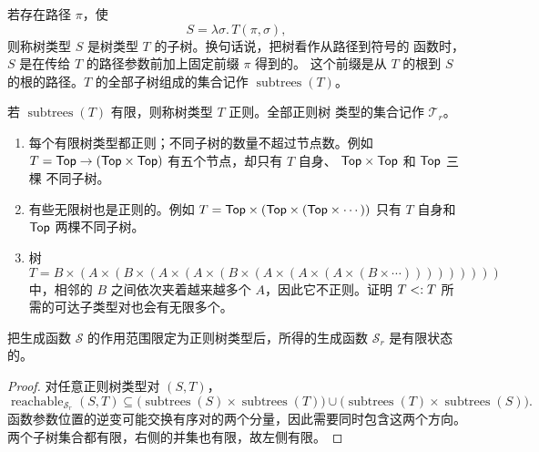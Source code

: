 \begin{definition}
\label{def:21.7.1}
若存在路径 \(\pi\)，使
\[
S=\lambda\sigma.\,T(\pi,\sigma),
\]
则称树类型 \(S\) 是树类型 \(T\) 的子树。换句话说，把树看作从路径到符号的
函数时，\(S\) 是在传给 \(T\) 的路径参数前加上固定前缀 \(\pi\) 得到的。
这个前缀是从 \(T\) 的根到 \(S\) 的根的路径。\(T\) 的全部子树组成的集合记作
\(\operatorname{subtrees}(T)\)。
\end{definition}

\begin{definition}
\label{def:21.7.2}
若 \(\operatorname{subtrees}(T)\) 有限，则称树类型 \(T\) 正则。全部正则树
类型的集合记作 \(\mathcal T_r\)。
\end{definition}

\taplstatementliststart
\begin{example}
\label{exm:21.7.3}
\taplstatementlistbreak
\begin{enumerate}
  \item 每个有限树类型都正则；不同子树的数量不超过节点数。例如
        \(T=\mathsf{Top}\to(\mathsf{Top}\times\mathsf{Top})\)
        有五个节点，却只有 \(T\) 自身、
        \(\mathsf{Top}\times\mathsf{Top}\) 和 \(\mathsf{Top}\) 三棵
        不同子树。
  \item 有些无限树也是正则的。例如
        \(T=\mathsf{Top}\times(\mathsf{Top}\times
        (\mathsf{Top}\times\cdots))\) 只有 \(T\) 自身和
        \(\mathsf{Top}\) 两棵不同子树。
  \item 树
        \[
        T=B\times(A\times(B\times(A\times(A\times
          (B\times(A\times(A\times(A\times(B\times\cdots)))))))))
        \]
        中，相邻的 \(B\) 之间依次夹着越来越多个 \(A\)，因此它不正则。证明
        \(T\mathrel{<:} T\) 所需的可达子类型对也会有无限多个。
\end{enumerate}
\end{example}

\begin{proposition}
\label{prop:21.7.4}
把生成函数 \(\mathcal S\) 的作用范围限定为正则树类型后，所得的生成函数
\(\mathcal S_r\) 是有限状态的。
\end{proposition}

\begin{proof}
对任意正则树类型对 \((S,T)\)，
\[
\operatorname{reachable}_{\mathcal S_r}(S,T)
\subseteq
\bigl(\operatorname{subtrees}(S)\times\operatorname{subtrees}(T)\bigr)
\cup
\bigl(\operatorname{subtrees}(T)\times\operatorname{subtrees}(S)\bigr).
\]
函数参数位置的逆变可能交换有序对的两个分量，因此需要同时包含这两个方向。
两个子树集合都有限，右侧的并集也有限，故左侧有限。
\end{proof}

